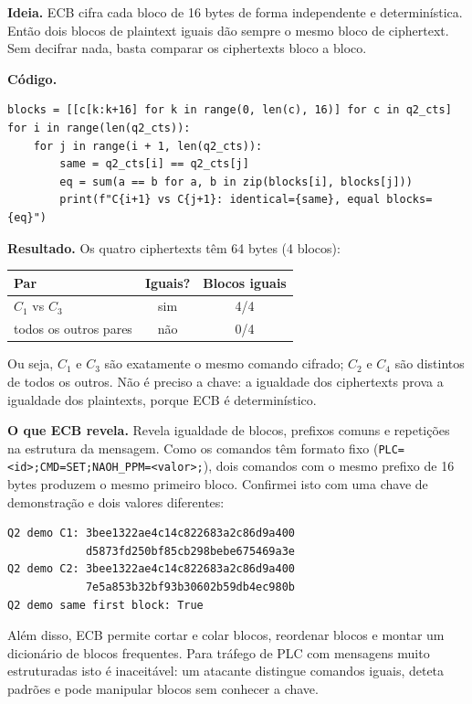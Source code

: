 \documentclass[11pt,a4paper]{article}
\begin{document}
\textbf{Ideia.} ECB cifra cada bloco de 16 bytes de forma independente e
determinística. Então dois blocos de plaintext iguais dão sempre o mesmo bloco
de ciphertext. Sem decifrar nada, basta comparar os ciphertexts bloco a bloco.

\textbf{Código.}

\begin{verbatim}
blocks = [[c[k:k+16] for k in range(0, len(c), 16)] for c in q2_cts]
for i in range(len(q2_cts)):
    for j in range(i + 1, len(q2_cts)):
        same = q2_cts[i] == q2_cts[j]
        eq = sum(a == b for a, b in zip(blocks[i], blocks[j]))
        print(f"C{i+1} vs C{j+1}: identical={same}, equal blocks={eq}")
\end{verbatim}

\textbf{Resultado.} Os quatro ciphertexts têm 64 bytes (4 blocos):

\begin{center}
\begin{tabular}{lcc}
\toprule
Par & Iguais? & Blocos iguais \\
\midrule
$C_1$ vs $C_3$ & sim & 4/4 \\
todos os outros pares & não & 0/4 \\
\bottomrule
\end{tabular}
\end{center}

Ou seja, $C_1$ e $C_3$ são exatamente o mesmo comando cifrado; $C_2$ e $C_4$
são distintos de todos os outros. Não é preciso a chave: a igualdade dos
ciphertexts prova a igualdade dos plaintexts, porque ECB é determinístico.

\textbf{O que ECB revela.} Revela igualdade de blocos, prefixos comuns e
repetições na estrutura da mensagem. Como os comandos têm formato fixo
(\texttt{PLC=<id>;CMD=SET;NAOH\_PPM=<valor>;}), dois comandos com o mesmo
prefixo de 16 bytes produzem o mesmo primeiro bloco. Confirmei isto com uma
chave de demonstração e dois valores diferentes:

\begin{verbatim}
Q2 demo C1: 3bee1322ae4c14c822683a2c86d9a400
            d5873fd250bf85cb298bebe675469a3e
Q2 demo C2: 3bee1322ae4c14c822683a2c86d9a400
            7e5a853b32bf93b30602b59db4ec980b
Q2 demo same first block: True
\end{verbatim}

Além disso, ECB permite cortar e colar blocos, reordenar blocos e montar um
dicionário de blocos frequentes. Para tráfego de PLC com mensagens muito
estruturadas isto é inaceitável: um atacante distingue comandos iguais,
deteta padrões e pode manipular blocos sem conhecer a chave.
\end{document}
